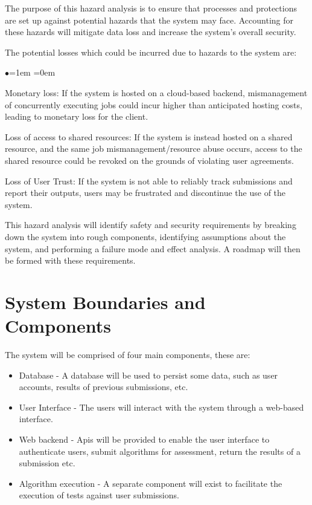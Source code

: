 \documentclass{article}
\begin{document}
The purpose of this hazard analysis is to ensure that processes and protections are set up against potential hazards that the system may face. Accounting for these hazards will mitigate data loss and increase the system's overall security. 

The potential losses which could be incurred due to hazards to the system are:
\begin{list}{$\bullet$}{\leftmargin=1em \itemindent=0em}
            \item Monetary loss: If the system is hosted on a cloud-based backend, mismanagement of concurrently executing jobs could incur higher than anticipated hosting costs, leading to monetary loss for the client.
            \item Loss of access to shared resources: If the system is instead hosted on a shared resource, and the same job mismanagement/resource abuse occurs, access to the shared resource could be revoked on the grounds of violating user agreements.
            \item Loss of User Trust: If the system is not able to reliably track submissions and report their outputs, users may be frustrated and discontinue the use of the system. 
        \end{list}

This hazard analysis will identify safety and security requirements by breaking down the system into rough components, identifying assumptions about the system, and performing a failure mode and effect analysis. A roadmap will then be formed with these requirements. 


\section{System Boundaries and Components}

The system will be comprised of four main components, these are:

\begin{itemize}
    \item Database - A database will be used to persist some data, such as user accounts, results of previous submissions, etc.
    \item User Interface - The users will interact with the system through a web-based interface.
    \item Web backend - Apis will be provided to enable the user interface to authenticate users, submit algorithms for assessment, return the results of a submission etc.
    \item Algorithm execution - A separate component will exist to facilitate the execution of tests against user submissions.
\end{itemize}
\end{document}
